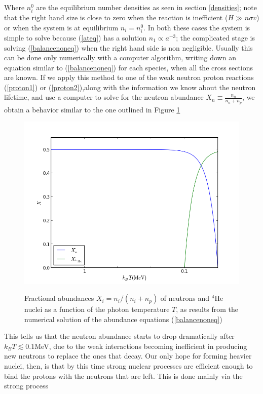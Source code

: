 \documentclass[11pt, a4paper,oneside,openright]{book}
\numberwithin{equation}{section}
\begin{document}
Where $n_i^0$ are the equilibrium number densities as seen in section \ref{densities}; note that the right hand size is close to zero when the reaction is inefficient ($H\gg n\sigma v$) or when the system is at equilibrium $n_i=n_i^0$. In both these cases the system is simple to solve because (\ref{ateq}) has a solution $n_1\propto a^{-3}$; the complicated stage is solving (\ref{balancenoneq}) when the right hand side is non negligible. Usually this can be done only numerically with a computer algorithm, writing down an equation similar to (\ref{balancenoneq}) for each species, when all the cross sections are known. If we apply this method to one of the weak neutron proton reactions (\ref{proton1}) or (\ref{proton2}),along with the information we know about the neutron lifetime, and use a computer to solve for the neutron abundance $X_n\equiv \frac{n_n}{n_n+n_p}$, we obtain a behavior similar to the one outlined in Figure \ref{abun}
\begin{figure}
\begin{center}
\includegraphics[scale=0.7]{Draw/abundances.png}
\label{}
\end{center}
\caption{Fractional abundances $X_i=n_i/(n_i+n_p)$ of neutrons and $^4$He nuclei as a function of the photon temperature $T$, as results from the numerical solution of the abundance equations (\ref{balancenoneq})}
\label{abun}
\end{figure}
This tells us that the neutron abundance starts to drop dramatically after $k_BT\lesssim 0.1$MeV, due to the weak interactions becoming inefficient in producing new neutrons to replace the ones that decay. Our only hope for forming heavier nuclei, then, is that by this time strong nuclear processes are efficient enough to bind the protons with the neutrons that are left. This is done mainly via the strong process
\end{document}
